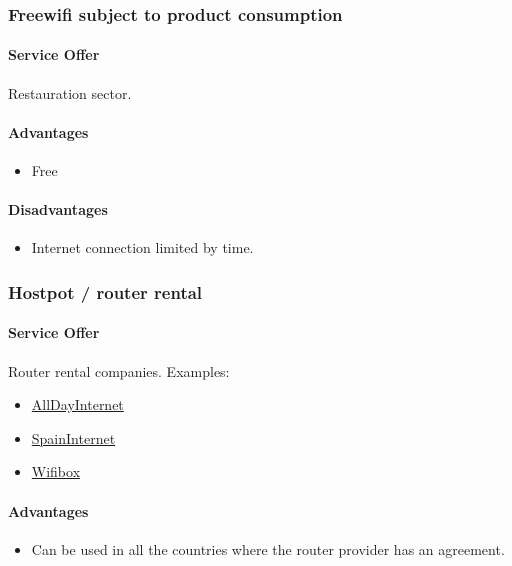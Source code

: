 \documentclass[12pt]{report}
\begin{document}
  \subsubsection{Freewifi subject to product consumption} \label{ch:freeWifi-consumtion}

  \paragraph*{Service Offer}
  Restauration sector.

  \paragraph*{Advantages}

  \begin{itemize}
    \item Free
  \end{itemize}

  \paragraph*{Disadvantages}

  \begin{itemize}
    \item Internet connection limited by time.
  \end{itemize}

  \subsubsection{Hostpot / router rental} \label{ch:router-rental}

  \paragraph*{Service Offer}
  Router rental companies. Examples:
  \begin{itemize}
    \item \href{https://alldayinternet.com/}{AllDayInternet}
    \item \href{https://www.spaininternet.net/es/alquiler-wifi-spain/}{SpainInternet}
    \item \href{https://wifivox.com/es/}{Wifibox}
  \end{itemize}

  \paragraph*{Advantages}
  \begin{itemize}
    \item Can be used in all the countries where the router provider has an agreement.
  \end{itemize}
\end{document}
